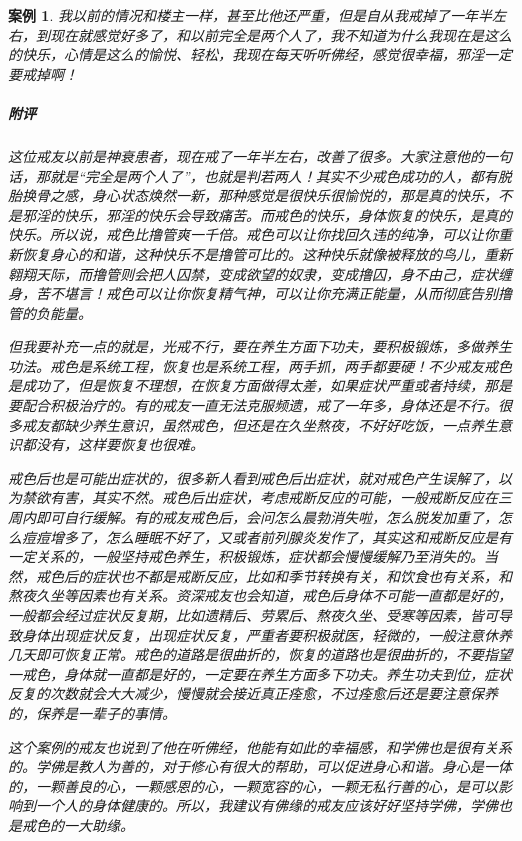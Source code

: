 \documentclass{ctexart}
\newtheorem{case}{案例}
\begin{document}
\begin{case}
    我以前的情况和楼主一样，甚至比他还严重，但是自从我戒掉了一年半左右，到现在就感觉好多了，和以前完全是两个人了，我不知道为什么我现在是这么的快乐，心情是这么的愉悦、轻松，我现在每天听听佛经，感觉很幸福，邪淫一定要戒掉啊！
    \subparagraph{附评} 这位戒友以前是神衰患者，现在戒了一年半左右，改善了很多。大家注意他的一句话，那就是“完全是两个人了”，也就是判若两人！其实不少戒色成功的人，都有脱胎换骨之感，身心状态焕然一新，那种感觉是很快乐很愉悦的，那是真的快乐，不是邪淫的快乐，邪淫的快乐会导致痛苦。而戒色的快乐，身体恢复的快乐，是真的快乐。所以说，戒色比撸管爽一千倍。戒色可以让你找回久违的纯净，可以让你重新恢复身心的和谐，这种快乐不是撸管可比的。这种快乐就像被释放的鸟儿，重新翱翔天际，而撸管则会把人囚禁，变成欲望的奴隶，变成撸囚，身不由己，症状缠身，苦不堪言！戒色可以让你恢复精气神，可以让你充满正能量，从而彻底告别撸管的负能量。

    但我要补充一点的就是，光戒不行，要在养生方面下功夫，要积极锻炼，多做养生功法。戒色是系统工程，恢复也是系统工程，两手抓，两手都要硬！不少戒友戒色是成功了，但是恢复不理想，在恢复方面做得太差，如果症状严重或者持续，那是要配合积极治疗的。有的戒友一直无法克服频遗，戒了一年多，身体还是不行。很多戒友都缺少养生意识，虽然戒色，但还是在久坐熬夜，不好好吃饭，一点养生意识都没有，这样要恢复也很难。

    戒色后也是可能出症状的，很多新人看到戒色后出症状，就对戒色产生误解了，以为禁欲有害，其实不然。戒色后出症状，考虑戒断反应的可能，一般戒断反应在三周内即可自行缓解。有的戒友戒色后，会问怎么晨勃消失啦，怎么脱发加重了，怎么痘痘增多了，怎么睡眠不好了，又或者前列腺炎发作了，其实这和戒断反应是有一定关系的，一般坚持戒色养生，积极锻炼，症状都会慢慢缓解乃至消失的。当然，戒色后的症状也不都是戒断反应，比如和季节转换有关，和饮食也有关系，和熬夜久坐等因素也有关系。资深戒友也会知道，戒色后身体不可能一直都是好的，一般都会经过症状反复期，比如遗精后、劳累后、熬夜久坐、受寒等因素，皆可导致身体出现症状反复，出现症状反复，严重者要积极就医，轻微的，一般注意休养几天即可恢复正常。戒色的道路是很曲折的，恢复的道路也是很曲折的，不要指望一戒色，身体就一直都是好的，一定要在养生方面多下功夫。养生功夫到位，症状反复的次数就会大大减少，慢慢就会接近真正痊愈，不过痊愈后还是要注意保养的，保养是一辈子的事情。

    这个案例的戒友也说到了他在听佛经，他能有如此的幸福感，和学佛也是很有关系的。学佛是教人为善的，对于修心有很大的帮助，可以促进身心和谐。身心是一体的，一颗善良的心，一颗感恩的心，一颗宽容的心，一颗无私行善的心，是可以影响到一个人的身体健康的。所以，我建议有佛缘的戒友应该好好坚持学佛，学佛也是戒色的一大助缘。
\end{case}
\end{document}
